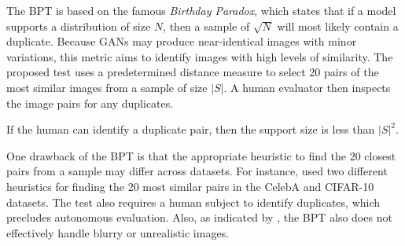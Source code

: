 The BPT is based on the famous \textit{Birthday Paradox}, which states that if a model supports a distribution of size $N$, then a sample of $\sqrt{N}$ will most likely contain a duplicate. 
Because GANs may produce near-identical images with minor variations, this metric aims to identify images with high levels of similarity.
The proposed test uses a predetermined distance measure to select 20 pairs of the most similar images from a sample of size $|S|$. 
A human evaluator then inspects the image pairs for any duplicates.
\begin{comment}	
\begin{enumerate}
    \item Using a predetermined measure, select 20 pairs of the most similar images from a sample of |S| images.
    \item Use a human to identify the presence of a duplicate pair.
    \item 
    \item Pick a sample size s from the generated distribution of the model.
    \item Using a pre-selected measure, choose 20 pairs of the most similar images from the sample.
    \item Use a human to identify the presence of a duplicate pair.
    \item Repeat.
\end{enumerate}
\end{comment}
If the human can identify a duplicate pair, then the support size is less than $|S|^2$.

One drawback of the BPT is that the appropriate heuristic to find the 20 closest pairs from a sample may differ across datasets.
For instance, \cite{arora2018gans} used two different heuristics for finding the 20 most similar pairs in the CelebA \cite{liu2015faceattributes} and CIFAR-10 \cite{krizhevsky2009learning} datasets.
The test also requires a human subject to identify duplicates, which precludes autonomous evaluation. 
Also, as indicated by \cite{arora2018gans}, the BPT also does not effectively handle blurry or unrealistic images. 
